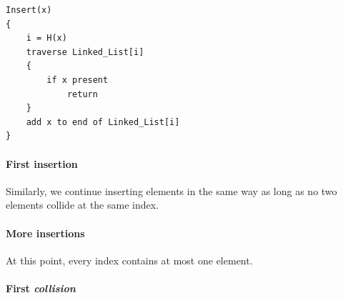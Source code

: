 \begin{center}
\begin{minipage}{0.9\linewidth}
\begin{framed}
\begin{Verbatim}
Insert(x)
{
    i = H(x)
    traverse Linked_List[i]
    {
        if x present
            return
    }
    add x to end of Linked_List[i]
}
\end{Verbatim}
\vspace{-4mm}
\end{framed}
\end{minipage}
\end{center}

\paragraph{First insertion}

\begin{center}
\end{center}

Similarly, we continue inserting elements in the same way as long as no two elements collide at the same index.

\paragraph{More insertions}

\begin{center}
\end{center}

At this point, every index contains at most one element.

\paragraph{First \emph{collision}}


